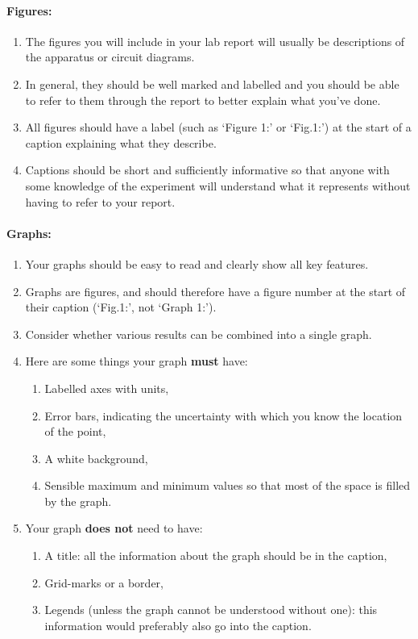\paragraph{Figures:} 
\begin{enumerate}
    \item The figures you will include in your lab report will usually be descriptions of the apparatus or circuit diagrams. 
    \item In general, they should be well marked and labelled and you should be able to refer to them through the report to better explain what you've done. 
    \item All figures should have a label (such as `Figure 1:' or `Fig.1:') at the start of a caption explaining what they describe. 
    \item Captions should be short and sufficiently informative so that anyone with some knowledge of the experiment will understand what it represents without having to refer to your report.
\end{enumerate}

\paragraph{Graphs:}
\begin{enumerate}
    \item Your graphs should be easy to read and clearly show all key features.
    \item Graphs are figures, and should therefore have a figure number at the start of their caption (`Fig.1:', not `Graph 1:').
    \item Consider whether various results can be combined into a single graph.
    \item Here are some things your graph \textbf{must} have:
    
    \begin{enumerate}
        \item Labelled axes with units,
        \item Error bars, indicating the uncertainty with which you know the location of the point,
        \item A white background,
        \item Sensible maximum and minimum values so that most of the space is filled by the graph.
    \end{enumerate}
    
    \item Your graph \textbf{does not} need to have:
    
    \begin{enumerate}
        \item A title: all the information about the graph should be in the caption,
        \item Grid-marks or a border,
        \item Legends (unless the graph cannot be understood without one): this information would preferably also go into the caption.
    \end{enumerate}

\end{enumerate}


